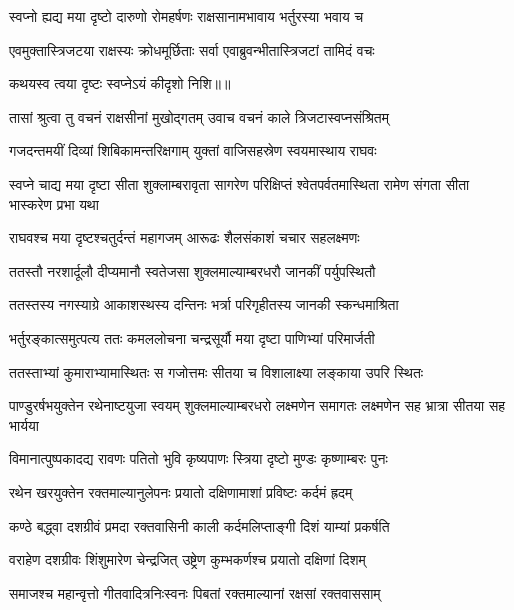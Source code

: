 \twolineshloka
{स्वप्नो ह्यद्य मया दृष्टो दारुणो रोमहर्षणः}
{राक्षसानामभावाय भर्तुरस्या भवाय च} %

\twolineshloka
{एवमुक्तास्त्रिजटया राक्षस्यः क्रोधमूर्छिताः}
{सर्वा एवाब्रुवन्भीतास्त्रिजटां तामिदं वचः} %

{कथयस्व त्वया दृष्टः स्वप्नेऽयं कीदृशो निशि॥॥} %

\addtocounter{shlokacount}{1}

\twolineshloka
{तासां श्रुत्वा तु वचनं राक्षसीनां मुखोद्गतम्}
{उवाच वचनं काले त्रिजटास्वप्नसंश्रितम्} %

\twolineshloka
{गजदन्तमयीं दिव्यां शिबिकामन्तरिक्षगाम्}
{युक्तां वाजिसहस्रेण स्वयमास्थाय राघवः} %

\threelineshloka
{स्वप्ने चाद्य मया दृष्टा सीता शुक्लाम्बरावृता}
{सागरेण परिक्षिप्तं श्वेतपर्वतमास्थिता}
{रामेण संगता सीता भास्करेण प्रभा यथा} %

\twolineshloka
{राघवश्च मया दृष्टश्चतुर्दन्तं महागजम्}
{आरूढः शैलसंकाशं चचार सहलक्ष्मणः} %

\twolineshloka
{ततस्तौ नरशार्दूलौ दीप्यमानौ स्वतेजसा}
{शुक्लमाल्याम्बरधरौ जानकीं पर्युपस्थितौ} %

\twolineshloka
{ततस्तस्य नगस्याग्रे आकाशस्थस्य दन्तिनः}
{भर्त्रा परिगृहीतस्य जानकी स्कन्धमाश्रिता} %

\twolineshloka
{भर्तुरङ्कात्समुत्पत्य ततः कमललोचना}
{चन्द्रसूर्यौ मया दृष्टा पाणिभ्यां परिमार्जती} %

\twolineshloka
{ततस्ताभ्यां कुमाराभ्यामास्थितः स गजोत्तमः}
{सीतया च विशालाक्ष्या लङ्काया उपरि स्थितः} %

\threelineshloka
{पाण्डुरर्षभयुक्तेन रथेनाष्टयुजा स्वयम्}
{शुक्लमाल्याम्बरधरो लक्ष्मणेन समागतः}
{लक्ष्मणेन सह भ्रात्रा सीतया सह भार्यया} %

\twolineshloka
{विमानात्पुष्पकादद्य रावणः पतितो भुवि}
{कृष्यपाणः स्त्रिया दृष्टो मुण्डः कृष्णाम्बरः पुनः} %

\twolineshloka
{रथेन खरयुक्तेन रक्तमाल्यानुलेपनः}
{प्रयातो दक्षिणामाशां प्रविष्टः कर्दमं ह्रदम्} %

\twolineshloka
{कण्ठे बद्ध्वा दशग्रीवं प्रमदा रक्तवासिनी}
{काली कर्दमलिप्ताङ्गी दिशं याम्यां प्रकर्षति} %

\twolineshloka
{वराहेण दशग्रीवः शिंशुमारेण चेन्द्रजित्}
{उष्ट्रेण कुम्भकर्णश्च प्रयातो दक्षिणां दिशम्} %

\twolineshloka
{समाजश्च महान्वृत्तो गीतवादित्रनिःस्वनः}
{पिबतां रक्तमाल्यानां रक्षसां रक्तवाससाम्} %

